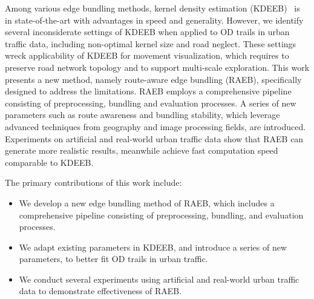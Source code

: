 Among various edge bundling methods, kernel density estimation (KDEEB)~\cite{hurter2012graph} is in state-of-the-art with advantages in speed and generality.
However, we identify several inconsiderate settings of KDEEB when applied to OD trails in urban traffic data, including non-optimal kernel size and road neglect.
These settings wreck applicability of KDEEB for movement visualization, which requires to preserve road network topology and to support multi-scale exploration.
This work presents a new method, namely route-aware edge bundling (RAEB), specifically designed to address the limitations.
RAEB employs a comprehensive pipeline consisting of preprocessing, bundling and evaluation processes.
A series of new parameters such as route awareness and bundling stability, which leverage advanced techniques from geography and image processing fields, are introduced.
Experiments on artificial and real-world urban traffic data show that RAEB can generate more realistic results, meanwhile achieve fast computation speed comparable to KDEEB.


The primary contributions of this work include:

\begin{itemize}
\item
We develop a new edge bundling method of RAEB, which includes a comprehensive pipeline consisting of preprocessing, bundling, and evaluation processes. 
\item
We adapt existing parameters in KDEEB, and introduce a series of new parameters, to better fit OD trails in urban traffic.
\item
We conduct several experiments using artificial and real-world urban traffic data to demonstrate effectiveness of RAEB. 
\end{itemize}